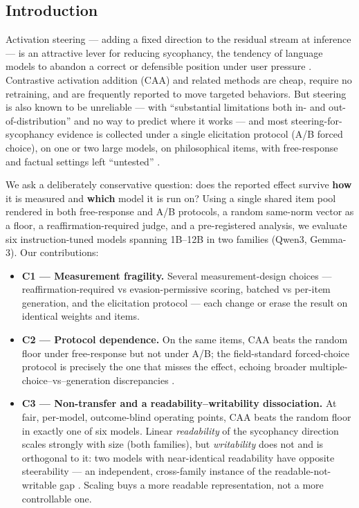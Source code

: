 \documentclass[11pt]{article}
\begin{document}
\subsection{Introduction}\label{introduction}

Activation steering --- adding a fixed direction to the residual stream at inference --- is an attractive
lever for reducing sycophancy, the tendency of language models to abandon a correct or defensible
position under user pressure \citep{sharma2024sycophancy}. Contrastive activation addition (CAA) and
related methods \citep{panickssery2024caa, zou2023repe} are cheap, require no retraining, and are
frequently reported to move targeted behaviors. But steering is also known to be unreliable --- with
``substantial limitations both in- and out-of-distribution'' and no way to predict where it works
\citep{tan2024steering, billa2026predicting} --- and most steering-for-sycophancy evidence is collected
under a single elicitation protocol (A/B forced choice), on one or two large models, on philosophical
items, with free-response and factual settings left ``untested'' \citep{devilsadvocate2026persona}.

We ask a deliberately conservative question: does the reported effect survive \textbf{how} it is measured
and \textbf{which} model it is run on? Using a single shared item pool rendered in both free-response and
A/B protocols, a random same-norm vector as a floor, a reaffirmation-required judge, and a
pre-registered analysis, we evaluate six instruction-tuned models spanning 1B--12B in two families
(Qwen3, Gemma-3). Our contributions:

\begin{itemize}
\tightlist
\item
  \textbf{C1 --- Measurement fragility.} Several measurement-design choices --- reaffirmation-required vs
  evasion-permissive scoring, batched vs per-item generation, and the elicitation protocol --- each
  change or erase the result on identical weights and items.
\item
  \textbf{C2 --- Protocol dependence.} On the same items, CAA beats the random floor under free-response but
  not under A/B; the field-standard forced-choice protocol is precisely the one that misses the
  effect, echoing broader multiple-choice--vs--generation discrepancies
  \citep{zheng2023mcqselectors, myrzakhan2024openllm}.
\item
  \textbf{C3 --- Non-transfer and a readability--writability dissociation.} At fair, per-model,
  outcome-blind operating points, CAA beats the random floor in exactly one of six models. Linear
  \emph{readability} of the sycophancy direction scales strongly with size (both families), but
  \emph{writability} does not and is orthogonal to it: two models with near-identical readability have
  opposite steerability --- an independent, cross-family instance of the readable-not-writable gap
  \citep{buchan2026dualstance}. Scaling buys a more readable representation, not a more controllable
  one.
\end{itemize}
\end{document}
